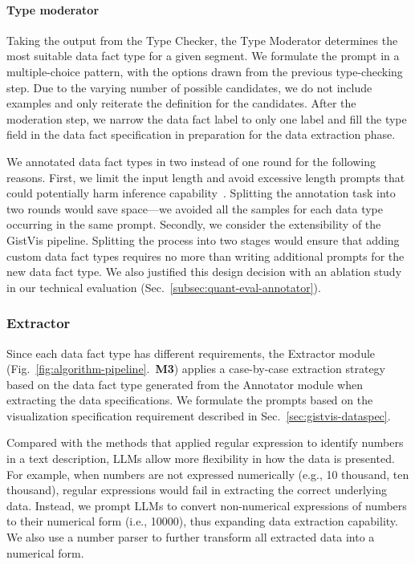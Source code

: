 \paragraph{Type moderator}
Taking the output from the Type Checker, the Type Moderator determines the most suitable data fact type for a given segment. We formulate the prompt in a multiple-choice pattern, with the options drawn from the previous type-checking step. Due to the varying number of possible candidates, we do not include examples and only reiterate the definition for the candidates. After the moderation step, we narrow the data fact label to only one label and fill the type field in the data fact specification in preparation for the data extraction phase.

We annotated data fact types in two instead of one round for the following reasons. First, we limit the input length and avoid excessive length prompts that could potentially harm inference capability~\cite{li2024longcontext}. Splitting the annotation task into two rounds would save space—we avoided all the samples for each data type occurring in the same prompt. Secondly, we consider the extensibility of the GistVis pipeline. Splitting the process into two stages would ensure that adding custom data fact types requires no more than writing additional prompts for the new data fact type. We also justified this design decision with an ablation study in our technical evaluation (Sec.~\ref{subsec:quant-eval-annotator}).

\subsubsection{Extractor}
Since each data fact type has different requirements, the Extractor module (Fig.~\ref{fig:algorithm-pipeline}.~\textbf{M3}) applies a case-by-case extraction strategy based on the data fact type generated from the Annotator module when extracting the data specifications. We formulate the prompts based on the visualization specification requirement described in Sec.~\ref{sec:gistvis-dataspec}.

Compared with the methods that applied regular expression to identify numbers in a text description, LLMs allow more flexibility in how the data is presented. For example, when numbers are not expressed numerically (e.g., 10 thousand, ten thousand), regular expressions would fail in extracting the correct underlying data. Instead, we prompt LLMs to convert non-numerical expressions of numbers to their numerical form (i.e., 10000), thus expanding data extraction capability. We also use a number parser to further transform all extracted data into a numerical form.



